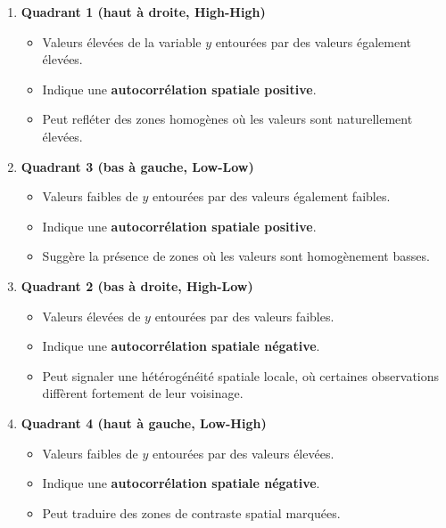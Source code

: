 \documentclass[
]{article}
\providecommand{\tightlist}{%
  \setlength{\itemsep}{0pt}\setlength{\parskip}{0pt}}
\begin{document}
\begin{enumerate}
\def\labelenumi{\arabic{enumi}.}
\tightlist
\item
  \textbf{Quadrant 1 (haut à droite, High-High)}

  \begin{itemize}
  \tightlist
  \item
    Valeurs élevées de la variable \(y\) entourées par des valeurs
    également élevées.\\
  \item
    Indique une \textbf{autocorrélation spatiale positive}.\\
  \item
    Peut refléter des zones homogènes où les valeurs sont naturellement
    élevées.
  \end{itemize}
\item
  \textbf{Quadrant 3 (bas à gauche, Low-Low)}

  \begin{itemize}
  \tightlist
  \item
    Valeurs faibles de \(y\) entourées par des valeurs également
    faibles.\\
  \item
    Indique une \textbf{autocorrélation spatiale positive}.\\
  \item
    Suggère la présence de zones où les valeurs sont homogènement
    basses.
  \end{itemize}
\item
  \textbf{Quadrant 2 (bas à droite, High-Low)}

  \begin{itemize}
  \tightlist
  \item
    Valeurs élevées de \(y\) entourées par des valeurs faibles.\\
  \item
    Indique une \textbf{autocorrélation spatiale négative}.\\
  \item
    Peut signaler une hétérogénéité spatiale locale, où certaines
    observations diffèrent fortement de leur voisinage.
  \end{itemize}
\item
  \textbf{Quadrant 4 (haut à gauche, Low-High)}

  \begin{itemize}
  \tightlist
  \item
    Valeurs faibles de \(y\) entourées par des valeurs élevées.\\
  \item
    Indique une \textbf{autocorrélation spatiale négative}.\\
  \item
    Peut traduire des zones de contraste spatial marquées.
  \end{itemize}
\end{enumerate}
\end{document}
